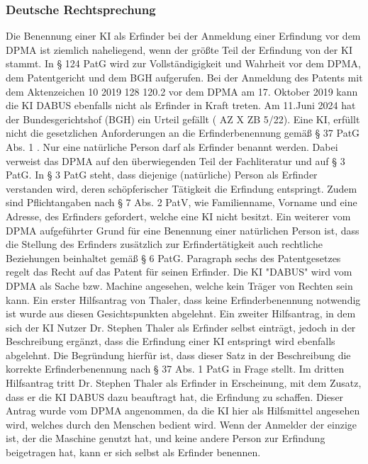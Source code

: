 \subsubsection{Deutsche Rechtsprechung}
Die Benennung einer KI als Erfinder 
bei der Anmeldung einer Erfindung vor dem DPMA
ist ziemlich naheliegend, wenn der größte
Teil der Erfindung von der KI stammt.
In § 124 PatG wird zur Vollständigigkeit und Wahrheit vor dem
DPMA, 
dem Patentgericht und dem BGH aufgerufen.
Bei der Anmeldung des Patents mit dem Aktenzeichen
10 2019 128 120.2 vor dem DPMA am 17. Oktober 2019  kann die KI 
DABUS ebenfalls nicht als Erfinder in Kraft treten. 
Am 11.Juni 2024 hat der Bundesgerichtshof (BGH) ein Urteil gefällt 
( AZ X ZB 5/22).
Eine KI, 
erfüllt nicht die gesetzlichen Anforderungen an die Erfinderbenennung 
gemäß § 37 PatG Abs. 1 . 
Nur eine natürliche Person darf 
als Erfinder benannt werden. 
Dabei verweist das DPMA auf den überwiegenden Teil
der Fachliteratur und auf § 3 PatG.
In § 3 PatG steht, dass diejenige (natürliche) Person als
Erfinder 
verstanden wird, 
deren schöpferischer Tätigkeit die Erfindung entspringt.
Zudem sind Pflichtangaben nach § 7 Abs. 2 PatV, wie 
Familienname, Vorname und eine Adresse, 
des Erfinders gefordert,
welche eine KI nicht besitzt. 
Ein weiterer vom DPMA aufgeführter Grund für eine 
Benennung einer natürlichen Person ist, dass 
die Stellung des Erfinders zusätzlich zur Erfindertätigkeit
auch rechtliche Beziehungen beinhaltet gemäß § 6 PatG.
Paragraph sechs des Patentgesetzes regelt das Recht auf
das Patent für seinen Erfinder.
Die KI "DABUS" wird vom DPMA als 
Sache bzw. Machine angesehen, 
welche kein Träger von Rechten sein kann.
Ein erster Hilfsantrag von Thaler, dass keine Erfinderbenennung notwendig 
ist wurde aus diesen Gesichtspunkten abgelehnt.
Ein zweiter Hilfsantrag, in dem sich der KI Nutzer
Dr. Stephen Thaler als Erfinder selbst einträgt, 
jedoch in der Beschreibung ergänzt, dass die Erfindung
einer KI entspringt wird ebenfalls abgelehnt.
Die Begründung hierfür ist, dass dieser Satz in der 
Beschreibung die korrekte Erfinderbenennung nach
§ 37 Abs. 1 PatG in Frage stellt.
Im dritten Hilfsantrag tritt Dr. Stephen Thaler
als Erfinder in Erscheinung, mit dem 
Zusatz, dass er die KI DABUS dazu beauftragt hat,
die Erfindung zu schaffen.
Dieser Antrag wurde vom DPMA angenommen,
da die KI hier als Hilfsmittel angesehen wird,
welches durch den Menschen bedient wird.
Wenn der Anmelder der einzige ist, 
der die Maschine genutzt hat, 
und keine andere Person zur Erfindung beigetragen hat, 
kann er sich selbst als Erfinder benennen. 
